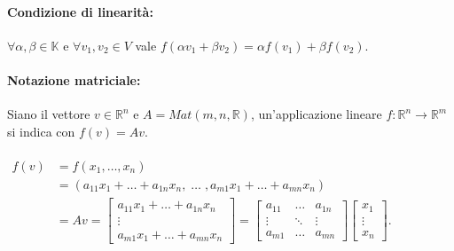 \documentclass[a4paper]{article}
\begin{document}
        \paragraph{Condizione di linearit\`{a}:}
        $
                \forall \alpha, \beta \in \mathbb{K}
                \mbox{ e }
                \forall v_{1},v_{2} \in V
        $ \quad vale \quad
        $
                f(\alpha v_{1} + \beta v_{2}) = \alpha f(v_{1}) + \beta f(v_{2}).
        $

        \paragraph{Notazione matriciale:}
        Siano il vettore $v \in \mathbb{R}^n$ e $A = Mat(m, n, \mathbb{R})$, un'applicazione lineare $ f\!: \mathbb{R}^n \rightarrow \mathbb{R}^m $ si indica con $ f(v) = Av $.

        \paragraph{}
        $
                \begin{aligned}
                        f(v) & = f(x_1, \dots, x_n) \\
                             & = (a_{11} x_1 + \dots + a_{1n} x_n,\; \dots \;, a_{m1} x_1 + \dots + a_{mn} x_n) \\
                             & = Av =
                             \begin{bmatrix}
                                     a_{11}x_1 + \dots + a_{1n}x_n \\
                                     \vdots \\
                                     a_{m1}x_1 + \dots + a_{mn}x_n
                             \end{bmatrix} = \begin{bmatrix}
                                     a_{11} & \dots & a_{1n} \\
                                     \vdots & \ddots & \vdots \\
                                     a_{m1} & \dots & a_{mn}
                             \end{bmatrix} \begin{bmatrix}
                                     x_1 \\
                                     \vdots \\
                                     x_n
                             \end{bmatrix}.
                \end{aligned}
        $
\end{document}

